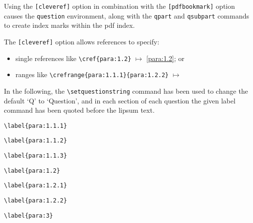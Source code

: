 \documentclass[a4paper,12pt]{article}
\begin{document}
	\maketitle
	
	Using the \verb|[cleveref]| option in combination with the \verb|[pdfbookmark]| option causes the \verb|question|  environment, along with the \verb|qpart| and \verb|qsubpart| commands to create index marks within the pdf index.

	The \verb|[cleveref]| option allows references to specify:
	\begin{itemize}
	    \item single references like \verb|\cref{para:1.2}| $\mapsto$ \cref{para:1.2}; or
	    \item ranges like \verb|| $\mapsto$ \crefrange{para:1.1.1}{para:1.2.2}
	\end{itemize}

In the following, the \verb|\setquestionstring| command has been used to change the default `Q' to `Question', and in each section of each question the given label command has been quoted before the lipsum text.

	
	\begin{question}
	\qpart\qsubpart
	\verb|\label{para:1.1.1}| \label{para:1.1.1} \lipsum[1-2]
	
	\qsubpart
	\verb|\label{para:1.1.2}| \label{para:1.1.2} \lipsum[3-4]

	\qsubpart
	\verb|\label{para:1.1.3}| \label{para:1.1.3} \lipsum[5-6]
	
	\qpart
	\verb|\label{para:1.2}| \label{para:1.2} \lipsum[7-8]
	
	\qsubpart
	\verb|\label{para:1.2.1}|\label{para:1.2.1} \lipsum[9-10]
	
	\qsubpart
	\verb|\label{para:1.2.2}| \label{para:1.2.2} \lipsum[11-12]
	
	\qpart
	\verb|\label{para:3}|\label{para:3} \lipsum[13-14]
\end{question}
\end{document}

